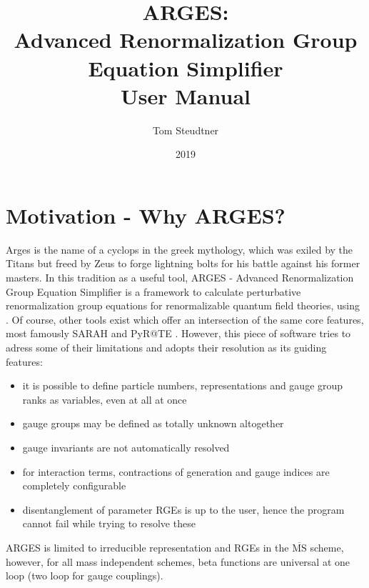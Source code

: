 \documentclass{scrartcl}
\title{ARGES: \\ Advanced Renormalization Group Equation Simplifier \\ User Manual}
\date{2019}
\author{Tom Steudtner}
\begin{document}
\begin{titlepage}
\maketitle
\end{titlepage}
\newpage
\tableofcontents
\thispagestyle{empty}
\newpage
\section{Motivation - Why ARGES?}
Arges is the name of a cyclops in the greek mythology, which was exiled by the Titans but freed by Zeus to forge lightning bolts for his battle against his former masters. \newline
In this tradition as a useful tool, ARGES - Advanced Renormalization Group Equation Simplifier is a framework to calculate perturbative renormalization group equations for renormalizable quantum field theories, using \cite{LuoWangXiao,MV1,MV2,MV3,vev1,vev2,gauge3L,gauge3L2,OsbornJack,OsbornJack2,OsbornJack3,Decoding,s4,poole}. Of course, other tools exist which offer an intersection of the same core features, most famously SARAH \cite{SARAH,SARAH4} and PyR@TE \cite{pyrate,pyrate2}. However, this piece of software tries to adress some of their limitations and adopts their resolution as its guiding features:
\begin{itemize}
\item it is possible to define particle numbers, representations and gauge group ranks as variables, even at all at once
\item gauge groups may be defined as totally unknown altogether
\item gauge invariants are not automatically resolved
\item for interaction terms, contractions of generation and gauge indices are completely configurable
\item disentanglement of parameter RGEs is up to the user, hence the program cannot fail while trying to resolve these
\end{itemize}
ARGES is limited to irreducible representation and RGEs in the $\overline{\mathrm{MS}}$ scheme, however, for all mass independent schemes, beta functions are universal at one loop (two loop for gauge couplings).
\newpage
\end{document}
